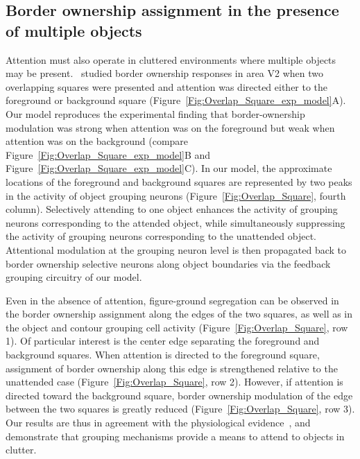 {\subsection{Border ownership assignment in the presence of multiple objects}
\label{sec:BOS_overlap}
Attention must also operate in cluttered environments where multiple
objects may be present.~\cite{Qiu_etal07} studied border ownership
responses in area V2 when two overlapping squares were presented and
attention was directed either to the foreground or background square
(Figure~\ref{Fig:Overlap_Square_exp_model}A). Our model reproduces the experimental finding that  border-ownership modulation was strong when attention was on the
  foreground but weak when attention was on the background (compare Figure~\ref{Fig:Overlap_Square_exp_model}B and Figure~\ref{Fig:Overlap_Square_exp_model}C).
In our model, the approximate locations of the foreground and background squares are represented by two peaks in the activity of object grouping neurons (Figure~\ref{Fig:Overlap_Square}, fourth column). Selectively attending to one object enhances the activity of grouping neurons corresponding to the attended object, while simultaneously suppressing the activity of grouping neurons corresponding to the unattended object. Attentional modulation at the grouping neuron level is then propagated back to border ownership selective neurons along object boundaries via the feedback grouping circuitry of our model.

 Even in the absence of attention, figure-ground segregation can be observed in the border ownership
assignment along the edges of the two squares, as well as in the
object and contour grouping cell activity
(Figure~\ref{Fig:Overlap_Square}, row 1). 
Of particular interest is
the center edge separating the foreground and background squares. When
attention is directed to the foreground square, assignment of border
ownership along this edge is strengthened
relative to the unattended case
(Figure~\ref{Fig:Overlap_Square}, row 2).
 However, if attention is
directed toward the background square, border ownership modulation of
the edge between the two squares is greatly reduced
(Figure~\ref{Fig:Overlap_Square}, row 3). 
Our results are thus in agreement
with the physiological evidence~\citep{Qiu_etal07}, and demonstrate
that grouping mechanisms provide a means to attend to objects in
clutter. 

}
